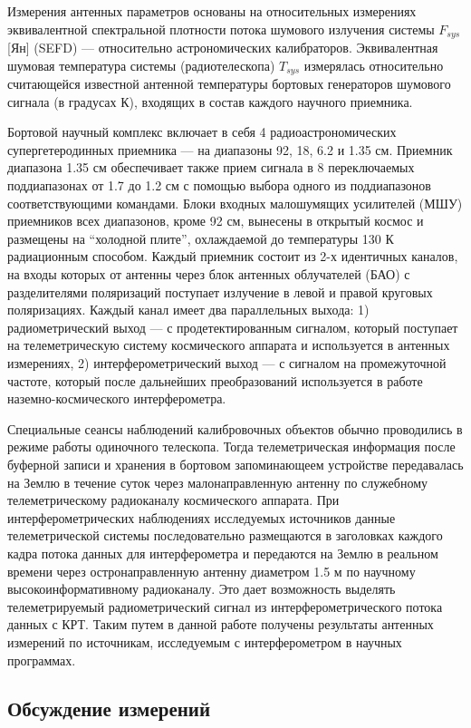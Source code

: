 Измерения антенных параметров основаны на относительных измерениях эквивалентной спектральной
плотности потока шумового излучения системы $F_{sys}$ [Ян] (SEFD) --- относительно астрономических
калибраторов. Эквивалентная шумовая температура системы (радиотелескопа) $T_{sys}$ измерялась
относительно считающейся известной антенной температуры бортовых генераторов шумового сигнала (в
градусах К), входящих в состав каждого научного приемника.

Бортовой научный комплекс включает в себя 4 радиоастрономических супергетеродинных приемника --- на
диапазоны 92, 18, 6.2 и 1.35 см. Приемник диапазона 1.35 см обеспечивает также прием сигнала в 8
переключаемых поддиапазонах от 1.7 до 1.2 см с помощью выбора одного из поддиапазонов
соответствующими командами. Блоки входных малошумящих усилителей (МШУ) приемников всех диапазонов,
кроме 92 см, вынесены в открытый космос и размещены на ``холодной плите'', охлаждаемой до
температуры 130 К радиационным способом. Каждый приемник состоит из 2-х идентичных каналов, на входы
которых от антенны через блок антенных облучателей (БАО) с разделителями поляризаций поступает
излучение в левой и правой круговых поляризациях. Каждый канал имеет два параллельных выхода: 1)
радиометрический выход --- с продетектированным сигналом, который поступает на телеметрическую
систему космического аппарата и используется в антенных измерениях, 2) интерферометрический выход
--- с сигналом на промежуточной частоте, который после дальнейших преобразований используется в
работе наземно-космического интерферометра.

Специальные сеансы наблюдений калибровочных объектов обычно проводились в режиме работы одиночного
телескопа. Тогда телеметрическая информация после буферной записи и хранения в бортовом
запоминающеем устройстве передавалась на Землю в течение суток через малонаправленную антенну по
служебному телеметрическому радиоканалу космического аппарата. При интерферометрических наблюдениях
исследуемых источников данные телеметрической системы последовательно размещаются в заголовках
каждого кадра потока данных для интерферометра и передаются на Землю в реальном времени через
остронаправленную антенну диаметром 1.5 м по научному высокоинформативному радиоканалу. Это дает
возможность выделять телеметрируемый радиометрический сигнал из интерферометрического потока данных
с КРТ. Таким путем в данной работе получены результаты антенных измерений по источникам, исследуемым
с интерферометром в научных программах.


\subsection{Обсуждение измерений}
